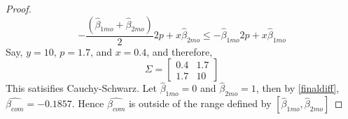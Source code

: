 \documentclass[letterpaper, 12pt]{article}
\begin{document}
\begin{enumerate}
\begin{proof}
\begin{equation}
-\frac{\left(\hat{\beta}_{1mo} + \hat{\beta}_{2mo}\right)
} {2}
2p
+
x \hat{\beta}_{2mo}
\leq
-\hat{\beta}_{1mo} 2 p + x \hat{\beta}_{1mo}
\end{equation}
Say, $y = 10$, $p=1.7$, and $x=0.4$, and therefore,
\begin{equation}
\Sigma = \begin{bmatrix}
0.4 & 1.7 \\ 1.7 & 10
\end{bmatrix}
\end{equation} 
This satisifies Cauchy-Schwarz.
Let $\hat{\beta}_{1mo} = 0$ and $\hat{\beta}_{2mo} = 1$, then by \eqref{finaldiff}, $\widehat{\beta_{com}}=-0.1857$. Hence $\widehat{\beta_{com}}$ is outside of the range defined by $[\hat{\beta}_{1mo}, \hat{\beta}_{2mo}]$
\end{proof}
\end{enumerate}
\end{document}
